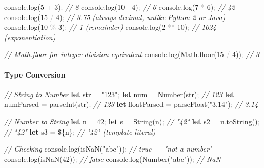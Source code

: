\documentclass[
  justified,
  openright,
]{tufte-book}
\let\subsection\paragraph
\let\paragraph\paragraph
\newcommand{\KeywordTok}[1]{\textcolor{CodeKeyword}{\textbf{#1}}}  %
\newcommand{\StringTok}[1]{\textcolor{CodeString}{#1}}              %
\newcommand{\CommentTok}[1]{\textcolor{CodeComment}{\textit{#1}}}  %
\newcommand{\CodeNumTok}[1]{\textcolor{CodeNumber}{#1}}             %
\newcommand{\CodeFuncTok}[1]{\textcolor{CodeKeyword}{#1}}           %
\newcommand{\CodeAccentTok}[1]{\textcolor{CodeAccent}{#1}}          %
\newcommand{\OperatorTok}[1]{\textcolor{DarkGray}{#1}}              %
\newenvironment{Shaded}{%
  \begin{mdframed}[style=TufteCode]%
}{%
  \end{mdframed}%
}
\let\subsection\paragraph
\let\paragraph\paragraph
\begin{document}
\begin{Shaded}
\begin{Highlighting}[]
console\OperatorTok{.}\CodeFuncTok{log}(\CodeNumTok{5} \OperatorTok{+} \CodeNumTok{3})\OperatorTok{;} \CommentTok{// 8}
console\OperatorTok{.}\CodeFuncTok{log}(\CodeNumTok{10} \OperatorTok{{-}} \CodeNumTok{4})\OperatorTok{;} \CommentTok{// 6}
console\OperatorTok{.}\CodeFuncTok{log}(\CodeNumTok{7} \OperatorTok{*} \CodeNumTok{6})\OperatorTok{;} \CommentTok{// 42}
console\OperatorTok{.}\CodeFuncTok{log}(\CodeNumTok{15} \OperatorTok{/} \CodeNumTok{4})\OperatorTok{;} \CommentTok{// 3.75  (always decimal, unlike Python 2 or Java)}
console\OperatorTok{.}\CodeFuncTok{log}(\CodeNumTok{10} \OperatorTok{\%} \CodeNumTok{3})\OperatorTok{;} \CommentTok{// 1  (remainder)}
console\OperatorTok{.}\CodeFuncTok{log}(\CodeNumTok{2} \OperatorTok{**} \CodeNumTok{10})\OperatorTok{;} \CommentTok{// 1024  (exponentiation)}
 
\CommentTok{// Math.floor for integer division equivalent}
console\OperatorTok{.}\CodeFuncTok{log}(Math\OperatorTok{.}\CodeFuncTok{floor}(\CodeNumTok{15} \OperatorTok{/} \CodeNumTok{4}))\OperatorTok{;} \CommentTok{// 3}
\end{Highlighting}
\end{Shaded}

\subsection{Type Conversion}\label{type-conversion}

\begin{Shaded}
\begin{Highlighting}[]
\CommentTok{// String to Number}
\KeywordTok{let} str \OperatorTok{=} \StringTok{"123"}\OperatorTok{;}
\KeywordTok{let} num \OperatorTok{=} Number(str)\OperatorTok{;} \CommentTok{// 123}
\KeywordTok{let} numParsed \OperatorTok{=} \CodeAccentTok{parseInt}(str)\OperatorTok{;} \CommentTok{// 123}
\KeywordTok{let} floatParsed \OperatorTok{=} \CodeAccentTok{parseFloat}(\StringTok{"3.14"})\OperatorTok{;} \CommentTok{// 3.14}
 
\CommentTok{// Number to String}
\KeywordTok{let} n \OperatorTok{=} \CodeNumTok{42}\OperatorTok{;}
\KeywordTok{let} s \OperatorTok{=} String(n)\OperatorTok{;} \CommentTok{// "42"}
\KeywordTok{let} s2 \OperatorTok{=} n\OperatorTok{.}\CodeFuncTok{toString}()\OperatorTok{;} \CommentTok{// "42"}
\KeywordTok{let} s3 \OperatorTok{=} \StringTok{\textasciigrave{}}\StringTok{\$\{}n\StringTok{\}}\StringTok{\textasciigrave{}}\OperatorTok{;} \CommentTok{// "42" (template literal)}
 
\CommentTok{// Checking}
console\OperatorTok{.}\CodeFuncTok{log}(\CodeAccentTok{isNaN}(\StringTok{"abc"}))\OperatorTok{;} \CommentTok{// true {-}{-}{-} "not a number"}
console\OperatorTok{.}\CodeFuncTok{log}(\CodeAccentTok{isNaN}(\CodeNumTok{42}))\OperatorTok{;} \CommentTok{// false}
console\OperatorTok{.}\CodeFuncTok{log}(Number(\StringTok{"abc"}))\OperatorTok{;} \CommentTok{// NaN}
\end{Highlighting}
\end{Shaded}
\end{document}
